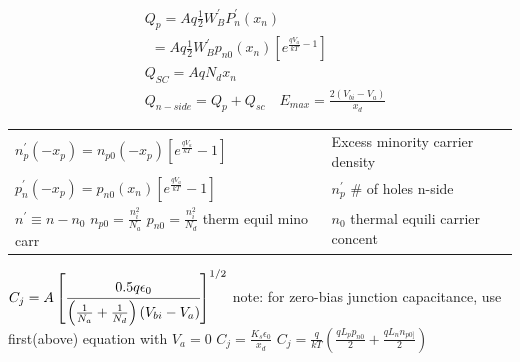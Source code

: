 \begin{multicols}{3}
\begin{align*}
& Q_p=Aq\frac{1}{2}W^\prime_BP^\prime_n(x_n) \\
& \ \ = Aq\frac{1}{2}W^\prime_B p_{n0}(x_n) \left[e^{\frac{qV_a}{kT}-1}\right] \\
& Q_{SC} = Aq N_d x_n \\
& Q_{n-side}=Q_p+Q_{sc} \quad E_{max}=\frac{2(V_{bi}-V_a)}{x_d}
\end{align*}
\begin{tabular}{p{5cm}p{3.25cm}}
$n^\prime_p(-x_p)=n_{p0}(-x_p)\left[e^{\frac{qV_a}{kT}}-1\right]$ & Excess minority \hfill \break carrier density \\
$p^\prime_n(-x_p)=p_{n0}(x_n)\left[e^{\frac{qV_a}{kT}}-1\right]$ & $n^\prime_p$ \# of holes n-side \\
$n^\prime \equiv n - n_0$ $n_{p0}=\frac{n_i^2}{N_a}$ 
$p_{n0}=\frac{n_i^2}{N_d}$ therm equil mino carr & $n_0$ thermal equili \hfill \break carrier concent \\
\end{tabular}
$C_j=  A\left[\cfrac{0.5q \epsilon_0}{\left(\frac{1}{N_a}+\frac{1}{N_d}\right)(V_{bi}-V_a)}\right]^{1/2}$ \hfill \break
note: for zero-bias junction capacitance, use first(above) equation with
$V_a= 0$ \hfill \break
 $C_j=\frac{K_s \epsilon_0}{x_d} $ $C_j= \frac{q}{kT} \left(\frac{qL_pp_{n0}}{2}+\frac{qL_nn_{p0]}}{2}\right)$


\end{multicols}
